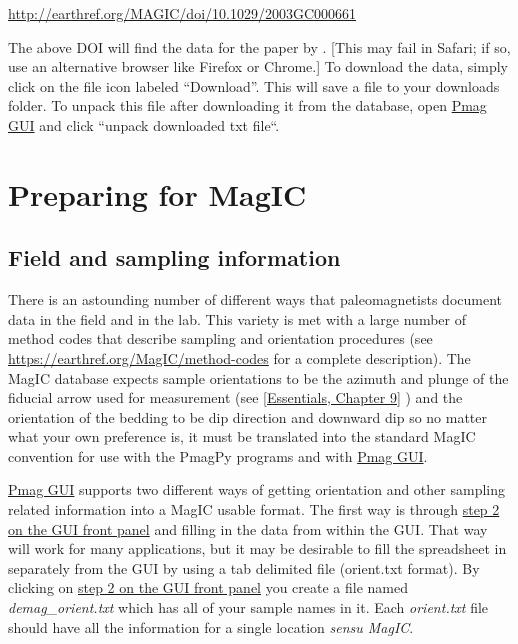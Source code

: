 \documentclass[11pt]{book}
\begin{document}
{{\href{http://earthref.org/MAGIC/doi/10.1029/2003GC000661}{http://earthref.org/MAGIC/doi/10.1029/2003GC000661}

\noindent The above DOI will find the data for the paper by \cite{tauxe04b}.  [This may fail in Safari; if so, use an alternative browser like Firefox or Chrome.]     To download the data, simply click on the file icon labeled ``Download''.  This will save a file to your downloads folder.
 To unpack this file after downloading it from the database, open \href{#pmag_gui.py}{Pmag GUI} and click ``unpack downloaded txt file``.


 \section{Preparing for MagIC}


\subsection{Field and sampling information}

 There is an astounding number of different ways that paleomagnetists document data in the field and in the lab. This variety is met with a large number  of method codes that describe sampling and orientation procedures (see \url{https://earthref.org/MagIC/method-codes} for a complete description).   The MagIC database expects sample orientations to be the azimuth and plunge of the fiducial arrow used for measurement (see  \href{http://earthref.org/MAGIC/books/Tauxe/Essentials/WebBook3ch2.html#ch2}{[Essentials, Chapter 9]} )  and the orientation of the bedding to be dip direction and downward dip so no matter what your own preference is, it must be translated into the standard MagIC convention for use with the PmagPy programs and with \href{#pmag_gui.py}{Pmag GUI}.

\href{#pmag_gui.py}{Pmag GUI}  supports two different ways of getting orientation and other sampling related information into a MagIC usable format.  The first way is through \href{#orient}{step 2 on the GUI front panel} and filling in the data from within the GUI.  That way will work for many applications, but it may be desirable to fill the spreadsheet in separately from the GUI by using  a tab delimited file (orient.txt format).   By clicking on  \href{#orient}{step 2 on the GUI front panel}  you create a file named {\it demag\_orient.txt}  which has all of your sample names in it.   Each {\it orient.txt} file should  have all the information for a single location {\it sensu MagIC}.


}}
\end{document}
